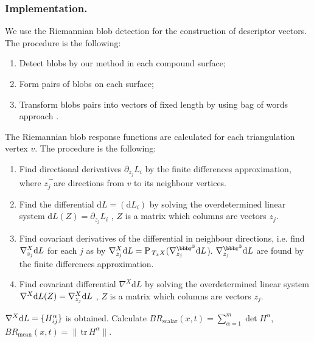 \documentclass{llncs}
\newcommand{\Proj}{\mathrm{P}{\,}}
\newcommand{\partderiv}[2]{\partial_{#2} {#1}}
\newcommand{\CovariantDiffManif}[1]{\nabla^{#1}}
\newcommand{\CovariantDerivManif}[2]{\tensor*{\nabla}{^{#1}_{#2}}}
\newcommand{\Diff}{\mathrm{d}}
\newcommand{\FRScalar}{BR_{\mathrm{scalar}}}
\newcommand{\FRMean}{BR_{\mathrm{mean}}}
\newcommand {\tr}{{\,}\mathrm{tr}{\,}}
\begin{document}
\subsubsection{Implementation.}
We use the Riemannian blob detection for the construction of descriptor vectors. The procedure is the following:
\begin{enumerate} 
\item Detect blobs by our method in each compound surface;
\item	Form pairs of blobs on each surface;
\item Transform blobs pairs into vectors of fixed length by using bag of words approach \cite{bag}.
\end{enumerate}
The Riemannian blob response functions are calculated for each triangulation vertex $v$. The procedure is the following:
\begin{enumerate} 
	\item Find directional derivatives $\partderiv{L_i}{z_j}$ by the finite differences approximation, where $z_j$̅ are directions from $v$ to its neighbour vertices. 
	\item Find the differential $\Diff L=(\Diff L_i)$ by solving the overdetermined linear system $\Diff L(Z)=\partderiv{L_i}{z_j}$ , $Z$  is a matrix which columns are vectors $z_j$.
	\item Find covariant derivatives of the differential in neighbour directions, i.e. find $\CovariantDerivManif{X}{z_j} \Diff L$ for each $j$ as by $\CovariantDerivManif{X}{z_j} \Diff L =\Proj_{T_xX} ( \CovariantDerivManif{\bbbr^3}{z_j} \Diff L$). $\CovariantDerivManif{\bbbr^3}{z_j} \Diff L$ are found by the finite differences approximation.
	\item Find covariant differential $\CovariantDiffManif{X} \Diff L$ by solving the overdetermined linear system 
	$\CovariantDiffManif{X} \Diff L(Z)=\CovariantDerivManif{X}{z_j} \Diff L$ , $Z$  is a matrix which columns are vectors $z_j$.
	\end{enumerate}
	$\CovariantDiffManif{X} \Diff L=\{\tensor*{H}{_i_j^\alpha} \}$ is obtained. Calculate $\FRScalar(x,t)=\sum_{\alpha=1}^{m}\det H^{\alpha}$,
	\\
	$\FRMean(x,t)=\|\tr H^{\alpha}\|$.	
\end{document}
